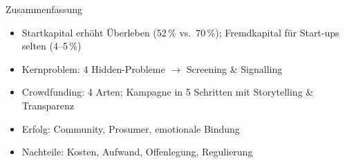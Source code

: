 \documentclass[a4paper, fontsize=7pt]{scrartcl}
\begin{document}
\begin{subbox}{Zusammenfassung}
\begin{itemize}
    \item Startkapital erhöht Überleben (52\,\% vs.\ 70\,\%); Fremdkapital für
    Start-ups selten (4--5\,\%)
    \item Kernproblem: 4 Hidden-Probleme $\to$ Screening \& Signalling
    \item Crowdfunding: 4 Arten; Kampagne in 5 Schritten mit Storytelling \&
    Transparenz
    \item Erfolg: Community, Prosumer, emotionale Bindung
    \item Nachteile: Kosten, Aufwand, Offenlegung, Regulierung
\end{itemize}
\end{subbox}

%
%
%
\end{document}
